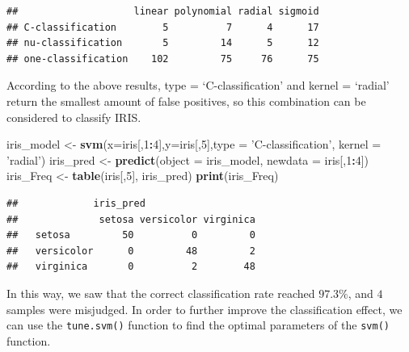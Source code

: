 \documentclass[
]{article}
\newenvironment{Shaded}{\begin{snugshade}}{\end{snugshade}}
\newcommand{\DataTypeTok}[1]{\textcolor[rgb]{0.13,0.29,0.53}{#1}}
\newcommand{\DecValTok}[1]{\textcolor[rgb]{0.00,0.00,0.81}{#1}}
\newcommand{\KeywordTok}[1]{\textcolor[rgb]{0.13,0.29,0.53}{\textbf{#1}}}
\newcommand{\NormalTok}[1]{#1}
\newcommand{\OperatorTok}[1]{\textcolor[rgb]{0.81,0.36,0.00}{\textbf{#1}}}
\newcommand{\StringTok}[1]{\textcolor[rgb]{0.31,0.60,0.02}{#1}}
\begin{document}
\begin{verbatim}
##                    linear polynomial radial sigmoid
## C-classification        5          7      4      17
## nu-classification       5         14      5      12
## one-classification    102         75     76      75
\end{verbatim}

According to the above results, type = `C-classification' and kernel =
`radial' return the smallest amount of false positives, so this
combination can be considered to classify IRIS.

\begin{Shaded}
\begin{Highlighting}[]
\NormalTok{iris_model <-}\StringTok{ }\KeywordTok{svm}\NormalTok{(}\DataTypeTok{x=}\NormalTok{iris[,}\DecValTok{1}\OperatorTok{:}\DecValTok{4}\NormalTok{],}\DataTypeTok{y=}\NormalTok{iris[,}\DecValTok{5}\NormalTok{],}\DataTypeTok{type =} \StringTok{'C-classification'}\NormalTok{, }\DataTypeTok{kernel =} \StringTok{'radial'}\NormalTok{)}
\NormalTok{iris_pred <-}\StringTok{ }\KeywordTok{predict}\NormalTok{(}\DataTypeTok{object =}\NormalTok{ iris_model, }\DataTypeTok{newdata =}\NormalTok{ iris[,}\DecValTok{1}\OperatorTok{:}\DecValTok{4}\NormalTok{])}
\NormalTok{iris_Freq <-}\StringTok{ }\KeywordTok{table}\NormalTok{(iris[,}\DecValTok{5}\NormalTok{], iris_pred)}
\KeywordTok{print}\NormalTok{(iris_Freq)}
\end{Highlighting}
\end{Shaded}

\begin{verbatim}
##             iris_pred
##              setosa versicolor virginica
##   setosa         50          0         0
##   versicolor      0         48         2
##   virginica       0          2        48
\end{verbatim}

In this way, we saw that the correct classification rate reached
\(97.3\%\), and \(4\) samples were misjudged. In order to further
improve the classification effect, we can use the \texttt{tune.svm()}
function to find the optimal parameters of the \texttt{svm()} function.
\end{document}
